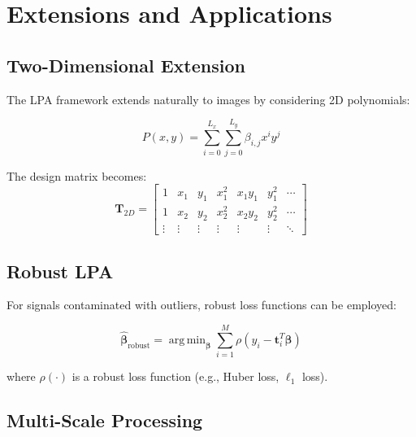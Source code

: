 \documentclass[12pt]{article}
\DeclareMathOperator{\argmin}{arg\,min}
\renewcommand{\vec}[1]{\mathbf{#1}}
\newcommand{\mat}[1]{\mathbf{#1}}
\theoremstyle{definition}
\begin{document}
\newpage

\section{Extensions and Applications}
\label{sec:extensions}

\subsection{Two-Dimensional Extension}
\label{subsec:2d_extension}

The LPA framework extends naturally to images by considering 2D polynomials:

\begin{equation}
    \label{eq:2d_polynomial}
    P(x,y) = \sum_{i=0}^{L_x} \sum_{j=0}^{L_y} \beta_{i,j} x^i y^j
\end{equation}

The design matrix becomes:
\begin{equation}
    \label{eq:2d_design_matrix}
    \mat{T}_{2D} = \begin{bmatrix}
        1      & x_1    & y_1    & x_1^2  & x_1y_1 & y_1^2  & \cdots \\
        1      & x_2    & y_2    & x_2^2  & x_2y_2 & y_2^2  & \cdots \\
        \vdots & \vdots & \vdots & \vdots & \vdots & \vdots & \ddots
    \end{bmatrix}
\end{equation}

\subsection{Robust LPA}
\label{subsec:robust_lpa}

For signals contaminated with outliers, robust loss functions can be employed:

\begin{equation}
    \label{eq:robust_objective}
    \hat{\vec{\beta}}_{\text{robust}} = \argmin_{\vec{\beta}} \sum_{i=1}^{M} \rho(y_i - \vec{t}_i^T\vec{\beta})
\end{equation}

where $\rho(\cdot)$ is a robust loss function (e.g., Huber loss, $\ell_1$ loss).

\subsection{Multi-Scale Processing}
\label{subsec:multiscale}
\end{document}

